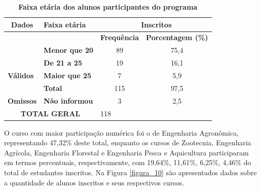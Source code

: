 \begin{table}[H]
\centering
\caption{\textbf{Faixa etária dos alunos participantes do programa}}
\label{tabela_45}
\begin{tabular}{clcc} 
\hline\hline
 \textbf{Dados}                       & \textbf{Faixa etária}  & \multicolumn{2}{c}{~\textbf{Inscritos} }                                                        \\ 
\hline
\multirow{3}{*}{}                     &                        & \multicolumn{1}{l}{\textbf{Frequência} } & \multicolumn{1}{l}{\textbf{Porcentagem (\%)} }  \\
                                      & \textbf{Menor que 20}  & 89                                            & 75,4                                            \\
                                      & \textbf{De 21 a 25}    & 19                                            & 16,1                                            \\
\multicolumn{1}{l}{\textbf{Válidos} } & \textbf{Maior que 25}  & 7                                             & 5,9                                             \\
\multicolumn{1}{l}{}                  & \textbf{Total}         & 115                                           & 97,5                                            \\ 
\hline
\multicolumn{1}{l}{\textbf{Omissos} } & \textbf{Não informou}  & 3                                             & 2,5                                             \\ 
\hline
\multicolumn{2}{c}{\textbf{TOTAL GERAL} }                      & \multicolumn{1}{l}{118}                       &                                                 \\
\hline\hline
\end{tabular}
\end{table}


O curso com maior participação numérica foi o de Engenharia Agronômica, representando 47,32\% deste total, enquanto os cursos de Zootecnia, Engenharia Agrícola, Engenharia Florestal e Engenharia Pesca e Aquicultura participaram em termos percentuais, respectivamente, com 19,64\%, 11,61\%, 6,25\%, 4,46\% do total de estudantes inscritos. Na Figura \ref{figura_10} são apresentados dados sobre a quantidade de alunos inscritos e seus respectivos cursos.



